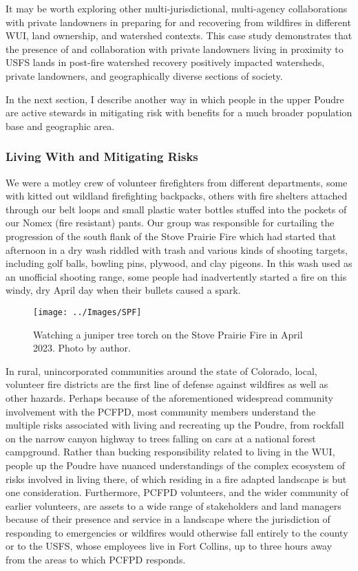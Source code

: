 \documentclass[
]{article}
\begin{document}
It may be worth exploring other multi-jurisdictional, multi-agency collaborations with private landowners in preparing for and recovering from wildfires in different WUI, land ownership, and watershed contexts. This case study demonstrates that the presence of and collaboration with private landowners living in proximity to USFS lands in post-fire watershed recovery positively impacted watersheds, private landowners, and geographically diverse sections of society.

In the next section, I describe another way in which people in the upper Poudre are active stewards in mitigating risk with benefits for a much broader population base and geographic area.

\subsubsection{Living With and Mitigating Risks}\label{living-with-and-mitigating-risks}

We were a motley crew of volunteer firefighters from different departments, some with kitted out wildland firefighting backpacks, others with fire shelters attached through our belt loops and small plastic water bottles stuffed into the pockets of our Nomex (fire resistant) pants. Our group was responsible for curtailing the progression of the south flank of the Stove Prairie Fire which had started that afternoon in a dry wash riddled with trash and various kinds of shooting targets, including golf balls, bowling pins, plywood, and clay pigeons. In this wash used as an unofficial shooting range, some people had inadvertently started a fire on this windy, dry April day when their bullets caused a spark.

\begin{figure}
\texttt{[image: ../Images/SPF]} \caption[Stove Prairie Fire]{Watching a juniper tree torch on the Stove Prairie Fire in April 2023. Photo by author.}\label{fig:figureTitle14}
\end{figure}

In rural, unincorporated communities around the state of Colorado, local, volunteer fire districts are the first line of defense against wildfires as well as other hazards. Perhaps because of the aforementioned widespread community involvement with the PCFPD, most community members understand the multiple risks associated with living and recreating up the Poudre, from rockfall on the narrow canyon highway to trees falling on cars at a national forest campground. Rather than bucking responsibility related to living in the WUI, people up the Poudre have nuanced understandings of the complex ecosystem of risks involved in living there, of which residing in a fire adapted landscape is but one consideration. Furthermore, PCFPD volunteers, and the wider community of earlier volunteers, are assets to a wide range of stakeholders and land managers because of their presence and service in a landscape where the jurisdiction of responding to emergencies or wildfires would otherwise fall entirely to the county or to the USFS, whose employees live in Fort Collins, up to three hours away from the areas to which PCFPD responds.
\end{document}
